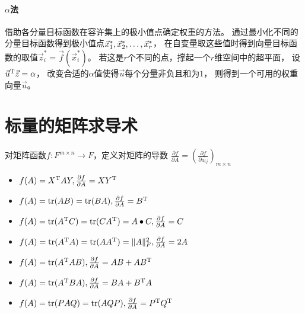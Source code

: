 \paragraph{$\alpha$法}
借助各分量目标函数在容许集上的极小值点确定权重的方法。
通过最小化不同的分量目标函数得到极小值点$\VectorComma{\vec{x}^*}{r}$，
在自变量取这些值时得到向量目标函数的取值$\vec{z}^*_i=\vec{f}(\vec{x}^*_i)$。
若这是$r$个不同的点，撑起一个$r$维空间中的超平面，
设$\vec{u}^\mathrm{T} \vec{z}=\alpha$，
改变合适的$\alpha$值使得$\vec{u}$每个分量非负且和为$1$，
则得到一个可用的权重向量$\vec{u}$。

\section{标量的矩阵求导术}
\begin{definition}
    对矩阵函数$f:F^{m\times n}\to F$，定义对矩阵的导数
    $\frac{\partial f}{\partial A}=\left(\frac{\partial f}{\partial a_{ij}}\right)_{m\times n}$
\end{definition}

\begin{itemize}
    \item $f(A)=X^\mathrm{T} AY,\frac{\partial f}{\partial A}=XY^\mathrm{T}$
    \item $f(A)=\operatorname{tr}(AB)=\operatorname{tr}(BA),\frac{\partial f}{\partial A} = B^\mathrm{T}$
    \item $f(A)=\operatorname{tr}(A^\mathrm{T} C)=\operatorname{tr}(CA^\mathrm{T})=A\bullet C,\frac{\partial f}{\partial A}=C$
    \item $f(A)=\operatorname{tr}(A^\mathrm{T} A)=\operatorname{tr}(AA^\mathrm{T})=\|A\|_F^2,\frac{\partial f}{\partial A}=2A$
    \item $f(A)=\operatorname{tr}(A^\mathrm{T} AB),\frac{\partial f}{\partial A}=AB+AB^\mathrm{T}$
    \item $f(A)=\operatorname{tr}(A^\mathrm{T} BA),\frac{\partial f}{\partial A}=BA+B^\mathrm{T} A$
    \item $f(A)=\operatorname{tr}(PAQ)=\operatorname{tr}(AQP),\frac{\partial f}{\partial A}=P^\mathrm{T} Q^\mathrm{T}$
\end{itemize}
